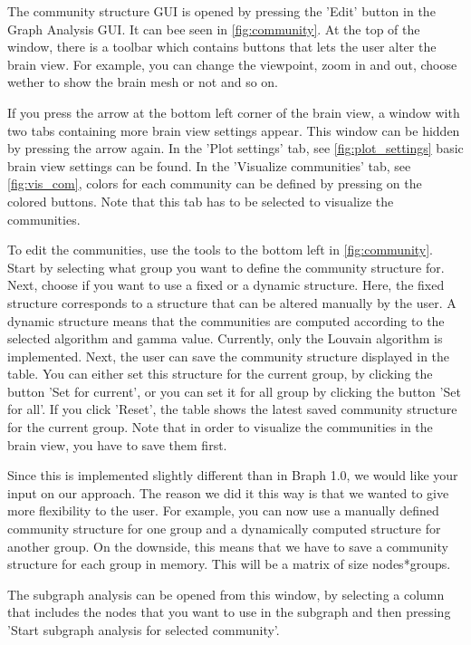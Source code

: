 \documentclass{article}
\begin{document}
The community structure GUI is opened by pressing the 'Edit' button in the Graph Analysis GUI. It can bee seen in \cref{fig:community}. At the top of the window, there is a toolbar which contains buttons that lets the user alter the brain view. For example, you can change the viewpoint, zoom in and out, choose wether to show the brain mesh or not and so on.

If you press the arrow at the bottom left corner of the brain view, a window with two tabs containing more brain view settings appear. This window can be hidden by pressing the arrow again. In the 'Plot settings' tab, see \cref{fig:plot_settings} basic brain view settings can be found. In the 'Visualize communities' tab, see \cref{fig:vis_com}, colors for each community can be defined by pressing on the colored buttons. Note that this tab has to be selected to visualize the communities. 

To edit the communities, use the tools to the bottom left in \cref{fig:community}. Start by selecting what group you want to define the community structure for. Next, choose if you want to use a fixed or a dynamic structure. Here, the fixed structure corresponds to a structure that can be altered manually by the user. A dynamic structure means that the communities are computed according to the selected algorithm and gamma value. Currently, only the Louvain algorithm is implemented. Next, the user can save the community structure displayed in the table. You can either set this structure for the current group, by clicking the button 'Set for current', or you can set it for all group by clicking the button 'Set for all'. If you click 'Reset', the table shows the latest saved community structure for the current group. Note that in order to visualize the communities in the brain view, you have to save them first.

Since this is implemented slightly different than in Braph 1.0, we would like your input on our approach. The reason we did it this way is that we wanted to give more flexibility to the user. For example, you can now use a manually defined community structure for one group and a dynamically computed structure for another group. On the downside, this means that we have to save a community structure for each group in memory. This will be a matrix of size nodes*groups.

The subgraph analysis can be opened from this window, by selecting a column that includes the nodes that you want to use in the subgraph and then pressing 'Start subgraph analysis for selected community'.
\end{document}

